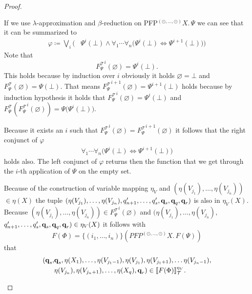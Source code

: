 \begin{proof}
\begin{compactitem}
         If we use $\lambda$-approximation and $\beta$-reduction on PFP$^{(\odot, \dots, \odot)} X.\,\Psi$ we can 
         see that it can be summarized to
         \begin{align*}
         \varphi \coloneqq \underset{i}{\bigvee} \Big(&\Psi^i(\bot) \wedge \forall_1 \dotsb \forall_n
         \big(\Psi^i(\bot) \Leftrightarrow \Psi^{i+1}(\bot)\big)\Big)
         \end{align*}
		Note that 
		\[{F_\Psi^\mathcal{T}}^i(\varnothing) = \Psi^i(\bot).\] 
		This holds because by induction over $i$ obviously it holds
		$\varnothing = \bot$
		and 
		$F_\Psi^\mathcal{T}(\varnothing) = \Psi(\bot).$
		That means 
		${F_\Psi^\mathcal{T}}^{i+1}(\varnothing) = \Psi^{i+1}(\bot)$
		holds because by induction hypothesis it holds that
		${F_\Psi^\mathcal{T}}^{i}
		(\varnothing) = \Psi^{i}(\bot)$
		and 
		$F_\Psi^\mathcal{T}({F_\Psi^\mathcal{T}}^{i}(\varnothing))= \Psi\big(\Psi^{i}(\bot)\big).$
		
		Because it exists an $i$ such that ${F_\Psi^\mathcal{T}}^i(\varnothing) = {F_\Psi^		
        \mathcal{T}}^{i+1}(\varnothing)$ it follows that the right conjunct of $\varphi$
		\begin{align*}
		\forall_1 \dotsb \forall_n \big(\Psi^i(\bot) \Leftrightarrow \Psi^{i+1}(\bot)\big)
         \end{align*}
		holds also. The left conjunct of $\varphi$ returns then the function that we get through  
		the $i$-th application of $\Psi$ on the empty set.
		
		Because of the construction of variable mapping $\eta_V$ and $(\eta(V_{j_1}), \dots, 
        \eta(V_{j_n}))$ $ \in \eta(X)$ the
        tuple $(\eta(V_{j_1}), \dots, \eta(V_{j_n}), q_{n+1}', \dots, q_s', \emph{q}_s, 
        \emph{q}_q,  \emph{q}_r)$ is also in $\eta_V(X)$.
         Because $(\eta(V_{j_1}), \dots, \eta(V_{j_n})) \in {F_\Psi^\mathcal{T}}^i(\varnothing)$ and $(\eta(V_{j_1}), \dots, \eta(V_{j_n}), $ $q_{n+1}', \dots, q_s', \emph{q}_s, \emph{q}_q,  
        \emph{q}_r) \in \eta_V(X)$ it follows with 
        \[F(\Phi) = \{(i_1, \dots, i_n)\} (PFP^{(\odot, \dots, \odot)} X.\, F(\Psi)) \]
        that 
        \begin{align*}
        (\emph{q}_s, &\emph{q}_s, \eta(X_1), \dots, \eta(V_{j_1-1}), \eta(V_{j_1}), \eta(V_{j_1+1}), \dots \eta(V_{j_n-1}),\\& \eta(V_{j_n}), \eta(V_{j_n+1}), \dots, \eta
            (X_q), \emph{q}_r) \in \llbracket F(\Phi) \rrbracket_\mathcal{T}^{\eta_V}.
        \end{align*}


\end{compactitem}
\end{proof}
